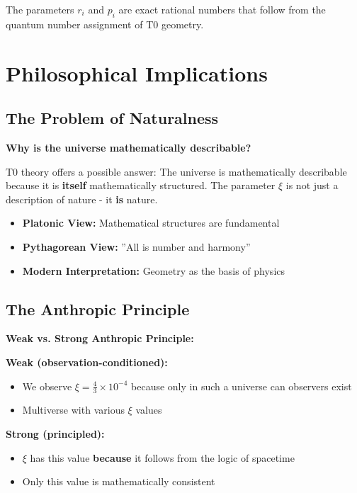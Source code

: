 	The parameters $r_i$ and $p_i$ are exact rational numbers that follow from the quantum number assignment of T0 geometry.
	
	\section{Philosophical Implications}
	
	\subsection{The Problem of Naturalness}
	
	\begin{foundation}
		\textbf{Why is the universe mathematically describable?}
		
		T0 theory offers a possible answer: The universe is mathematically describable because it is \textbf{itself} mathematically structured. The parameter $\xi$ is not just a description of nature - it \textbf{is} nature.
		
		\begin{itemize}
			\item \textbf{Platonic View:} Mathematical structures are fundamental
			\item \textbf{Pythagorean View:} ''All is number and harmony''
			\item \textbf{Modern Interpretation:} Geometry as the basis of physics
		\end{itemize}
	\end{foundation}
	
	\subsection{The Anthropic Principle}
	
	\begin{alternative}
		\textbf{Weak vs. Strong Anthropic Principle:}
		
		\textbf{Weak (observation-conditioned):}
		\begin{itemize}
			\item We observe $\xi = \frac{4}{3} \times 10^{-4}$ because only in such a universe can observers exist
			\item Multiverse with various $\xi$ values
		\end{itemize}
		
		\textbf{Strong (principled):}
		\begin{itemize}
			\item $\xi$ has this value \textbf{because} it follows from the logic of spacetime
			\item Only this value is mathematically consistent
		\end{itemize}
	\end{alternative}
	
